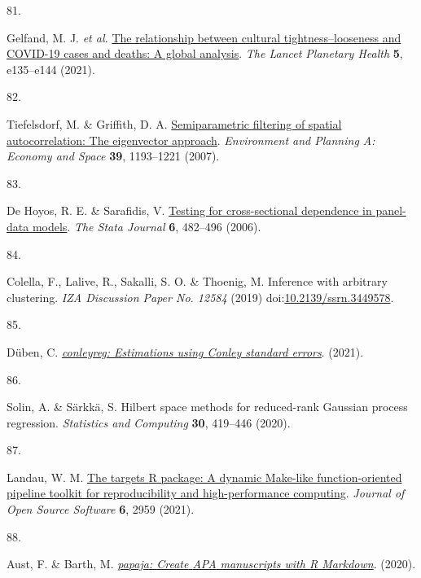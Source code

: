 \documentclass[
  man,floatsintext]{apa6}
\newlength{\cslhangindent}
\newlength{\csllabelwidth}
\newlength{\cslentryspacingunit} %
\newenvironment{CSLReferences}[2] %
 {%
  \setlength{\parindent}{0pt}
  \ifodd #1
  \let\oldpar\par
  \def\par{\hangindent=\cslhangindent\oldpar}
  \fi
  \setlength{\parskip}{#2\cslentryspacingunit}
 }%
 {}
\newcommand{\CSLLeftMargin}[1]{\parbox[t]{\csllabelwidth}{#1}}
\newcommand{\CSLRightInline}[1]{\parbox[t]{\linewidth - \csllabelwidth}{#1}\break}
\begin{document}
\begin{CSLReferences}{0}{0}
\leavevmode{}%
\CSLLeftMargin{81. }%
\CSLRightInline{Gelfand, M. J. \emph{et al.} \href{https://doi.org/10.1016/S2542-5196(20)30301-6}{The relationship between cultural tightness--looseness and {COVID-19} cases and deaths: A global analysis}. \emph{The Lancet Planetary Health} \textbf{5}, e135--e144 (2021).}

\leavevmode{}%
\CSLLeftMargin{82. }%
\CSLRightInline{Tiefelsdorf, M. \& Griffith, D. A. \href{https://doi.org/10.1068/a37378}{Semiparametric filtering of spatial autocorrelation: The eigenvector approach}. \emph{Environment and Planning A: Economy and Space} \textbf{39}, 1193--1221 (2007).}

\leavevmode{}%
\CSLLeftMargin{83. }%
\CSLRightInline{De Hoyos, R. E. \& Sarafidis, V. \href{https://doi.org/10.1177/1536867X0600600403}{Testing for cross-sectional dependence in panel-data models}. \emph{The Stata Journal} \textbf{6}, 482--496 (2006).}

\leavevmode{}%
\CSLLeftMargin{84. }%
\CSLRightInline{Colella, F., Lalive, R., Sakalli, S. O. \& Thoenig, M. Inference with arbitrary clustering. \emph{IZA Discussion Paper No. 12584} (2019) doi:\href{https://doi.org/10.2139/ssrn.3449578}{10.2139/ssrn.3449578}.}

\leavevmode{}%
\CSLLeftMargin{85. }%
\CSLRightInline{Düben, C. \emph{\href{https://CRAN.R-project.org/package=conleyreg}{{conleyreg}: Estimations using {C}onley standard errors}}. (2021).}

\leavevmode{}%
\CSLLeftMargin{86. }%
\CSLRightInline{Solin, A. \& Särkkä, S. Hilbert space methods for reduced-rank {G}aussian process regression. \emph{Statistics and Computing} \textbf{30}, 419--446 (2020).}

\leavevmode{}%
\CSLLeftMargin{87. }%
\CSLRightInline{Landau, W. M. \href{https://doi.org/10.21105/joss.02959}{The targets {R} package: A dynamic {M}ake-like function-oriented pipeline toolkit for reproducibility and high-performance computing}. \emph{Journal of Open Source Software} \textbf{6}, 2959 (2021).}

\leavevmode{}%
\CSLLeftMargin{88. }%
\CSLRightInline{Aust, F. \& Barth, M. \emph{\href{https://github.com/crsh/papaja}{{papaja}: {Create} {APA} manuscripts with {R Markdown}}}. (2020).}

\end{CSLReferences}
\end{document}
